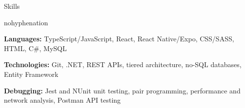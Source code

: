 \documentclass[
	11pt, %
]{article} %
\begin{document}
\printname

\begin{rSection}{Skills}
	\begin{hyphenrules}{nohyphenation}

		\begin{rSubsection}{}{}{}{}
			\item \textbf{Languages:} TypeScript/JavaScript, React, React Native/Expo, CSS/SASS, HTML, C\#, MySQL
			\item \textbf{Technologies:} Git, .NET, REST APIs, tiered architecture, no-SQL databases, Entity Framework
			\item \textbf{Debugging:} Jest and NUnit unit testing, pair programming, performance and network analysis, Postman API testing
		\end{rSubsection}

	\end{hyphenrules}
\end{rSection}
\end{document}
